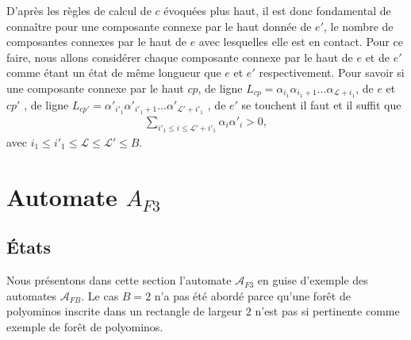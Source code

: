 D'après les règles de calcul de $c$ évoquées plus haut, il est donc fondamental de connaître pour  une composante connexe par le haut  donnée de $e'$, le nombre de  composantes connexes par le haut de $e$ avec lesquelles elle est en contact. Pour ce faire, nous allons considérer chaque composante connexe par le haut de $e$ et de $e'$ comme étant un état   de même longueur que $e$ et $e'$ respectivement. Pour savoir si une composante connexe par le haut $cp$, de ligne $L_{cp}=\alpha_{i_{1}}\alpha_{i_{1}+1}...\alpha_{\mathcal{L}+i_{1}}$, de $e$ et $cp'$ , de ligne $L_{cp'}=\alpha'_{i'_{1}}\alpha'_{i'_{1}+1}...\alpha'_{\mathcal{L}'+i'_{1}}$ , de $e'$ se touchent il faut et il suffit que 
\begin{eqnarray*}\label{condcontact1}
\sum_{i'_{1}\leq i\leq \mathcal{L}'+i'_{1}}\alpha_{i}\alpha'_{i}>0,
\end{eqnarray*}
avec $i_{1}\leq i'_{1}\leq \mathcal{L}\leq \mathcal{L}'\leq B.$ 

\section{Automate $A_{F3}$}
\begin{spacing}{0.30}
\subsection{États}
\end{spacing}
Nous présentons dans cette section l'automate $\mathcal{A}_{F3}$ en guise d'exemple des automates $\mathcal{A}_{FB}$. Le cas $B=2$ n'a pas été abordé parce qu'une forêt de polyominos inscrite dans un rectangle de largeur $2$ n'est pas si pertinente comme exemple de forêt de polyominos.

